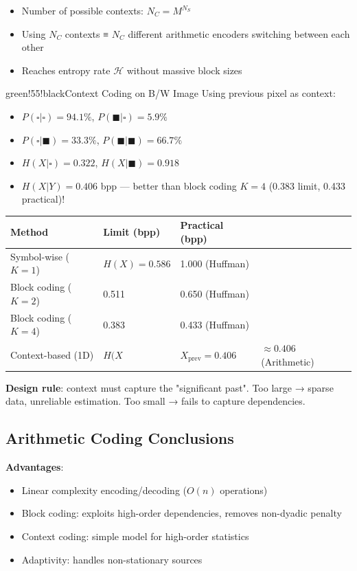 \begin{itemize}
\item Number of possible contexts: $N_C = M^{N_S}$
\item Using $N_C$ contexts ≡ $N_C$ different arithmetic encoders switching between each other
\item Reaches entropy rate $\mathcal{H}$ without massive block sizes
\end{itemize}

\begin{calloutbox}{green!55!black}{Context Coding on B/W Image}
Using previous pixel as context:
\begin{itemize}
\item $P(\square|\square) = 94.1\%$, $P(\blacksquare|\square) = 5.9\%$
\item $P(\square|\blacksquare) = 33.3\%$, $P(\blacksquare|\blacksquare) = 66.7\%$
\item $H(X|\square) = 0.322$, $H(X|\blacksquare) = 0.918$
\item $H(X|Y) = 0.406$ bpp — better than block coding $K=4$ (0.383 limit, 0.433 practical)!
\end{itemize}
\end{calloutbox}

\begin{center}
\begin{tabular}{|l|l|l|l|}
\hline
\textbf{Method} & \textbf{Limit (bpp)} & \textbf{Practical (bpp)} & \textbf{} \\ \hline
Symbol-wise ($K=1$) & $H(X)=0.586$ & 1.000 (Huffman) &  \\ \hline
Block coding ($K=2$) & 0.511 & 0.650 (Huffman) &  \\ \hline
Block coding ($K=4$) & 0.383 & 0.433 (Huffman) &  \\ \hline
Context-based (1D) & $H(X         $ & $X_\text{prev}=0.406$ & $\approx 0.406$ (Arithmetic) \\ \hline
\end{tabular}
\end{center}

\textbf{Design rule}: context must capture the "significant past". Too large → sparse data, unreliable estimation. Too small → fails to capture dependencies.

\subsection{Arithmetic Coding Conclusions}

\textbf{Advantages}:
\begin{itemize}
\item Linear complexity encoding/decoding ($O(n)$ operations)
\item Block coding: exploits high-order dependencies, removes non-dyadic penalty
\item Context coding: simple model for high-order statistics
\item Adaptivity: handles non-stationary sources
\end{itemize}


